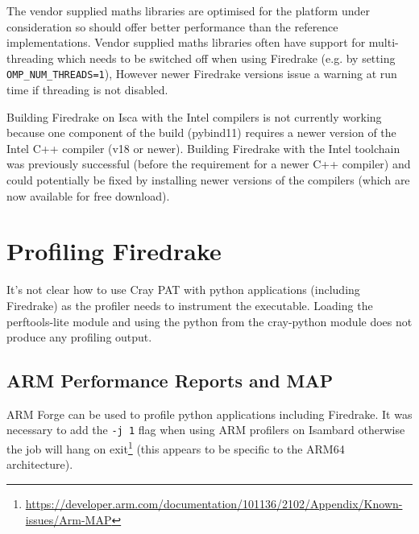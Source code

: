 \documentclass[a4paper,titlepage]{article}
\begin{document}
The vendor supplied maths libraries are optimised for the platform under consideration so should offer better performance than the reference implementations. 
Vendor supplied maths libraries often have support for multi-threading which needs to be switched off when using Firedrake (e.g. by setting \verb+OMP_NUM_THREADS=1+), However newer Firedrake versions issue a warning at run time if threading is not disabled. 

Building Firedrake on Isca with the Intel compilers is not currently working because one component of the build (pybind11) requires a newer version of the Intel C++ compiler (v18 or newer). Building Firedrake with the Intel toolchain was previously successful (before the requirement for a newer C++ compiler) and could potentially be fixed by installing newer versions of the compilers (which are now available for free download).


\section{Profiling Firedrake}
\label{section:profiling_firedrake}

It's not clear how to use Cray PAT with python applications (including Firedrake) as the profiler needs to instrument the executable. Loading the perftools-lite module and using the python from the cray-python module does not produce any profiling output.


\subsection{ARM Performance Reports and MAP}

ARM Forge can be used to profile python applications including Firedrake. It was necessary to add the \verb+-j 1+ flag when using ARM profilers on Isambard otherwise the job will hang on exit\footnote{\url{https://developer.arm.com/documentation/101136/2102/Appendix/Known-issues/Arm-MAP}} (this appears to be specific to the ARM64 architecture).
\end{document}
